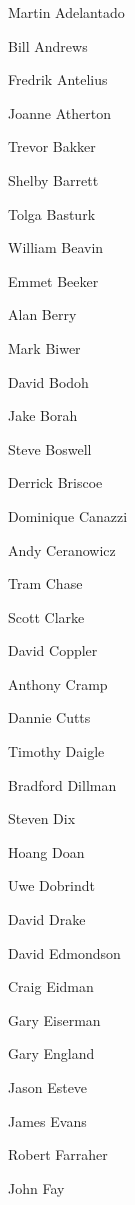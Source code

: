 \vspace{4.02pt}
\noindent\hspace*{29.2pt}%
\begin{minipage}[t]{110pt}
    \frontNamesTight
    Martin Adelantado\par
    Bill Andrews\par
    Fredrik Antelius\par
    Joanne Atherton\par
    Trevor Bakker\par
    Shelby Barrett\par
    Tolga Basturk\par
    William Beavin\par
    Emmet Beeker\par
    Alan Berry\par
    Mark Biwer\par
    David Bodoh
\end{minipage}%
\hspace*{45.5pt}%
\begin{minipage}[t]{100pt}
    \frontNamesTight
    Jake Borah\par
    Steve Boswell\par
    Derrick Briscoe\par
    Dominique Canazzi\par
    Andy Ceranowicz\par
    Tram Chase\par
    Scott Clarke\par
    David Coppler\par
    Anthony Cramp\par
    Dannie Cutts\par
    Timothy Daigle\par
    Bradford Dillman
\end{minipage}%
\hspace*{52.55pt}%
\begin{minipage}[t]{90pt}
    \frontNamesTight
    Steven Dix\par
    Hoang Doan\par
    Uwe Dobrindt\par
    David Drake\par
    David Edmondson\par
    Craig Eidman\par
    Gary Eiserman\par
    Gary England\par
    Jason Esteve\par
    James Evans\par
    Robert Farraher\par
    John Fay
\end{minipage}
\endgroup
\clearpage

